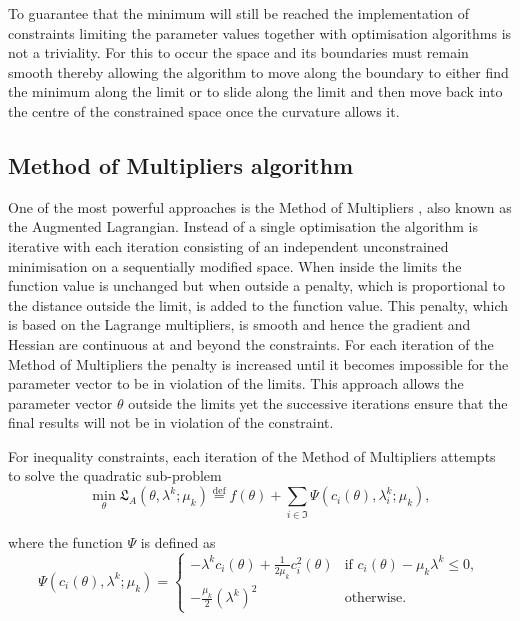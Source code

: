 To guarantee that the minimum will still be reached the implementation of constraints limiting the parameter values together with optimisation algorithms is not a triviality.
For this to occur the space and its boundaries must remain smooth thereby allowing the algorithm to move along the boundary to either find the minimum along the limit or to slide along the limit and then move back into the centre of the constrained space once the curvature allows it.



\subsection{Method of Multipliers algorithm}

One of the most powerful approaches is the Method of Multipliers \citep{NocedalWright99}, also known as the Augmented Lagrangian.
Instead of a single optimisation the algorithm is iterative with each iteration consisting of an independent unconstrained minimisation on a sequentially modified space.
When inside the limits the function value is unchanged but when outside a penalty, which is proportional to the distance outside the limit, is added to the function value.
This penalty, which is based on the Lagrange multipliers, is smooth and hence the gradient and Hessian are continuous at and beyond the constraints.
For each iteration of the Method of Multipliers the penalty is increased until it becomes impossible for the parameter vector to be in violation of the limits.
This approach allows the parameter vector $\theta$ outside the limits yet the successive iterations ensure that the final results will not be in violation of the constraint.

For inequality constraints, each iteration of the Method of Multipliers attempts to solve the quadratic sub-problem
\begin{equation} \label{eq: Augmented Lagrangian}
    \min_\theta \mathfrak{L}_A(\theta, \lambda^k; \mu_k) \stackrel{\mathrm{def}}{=} f(\theta) + \sum_{i \in \mathfrak{I}} \Psi(c_i(\theta), \lambda_i^k; \mu_k),
\end{equation}

\noindent where the function $\Psi$ is defined as
\begin{equation}
    \Psi(c_i(\theta), \lambda^k; \mu_k) = \begin{cases}
        -\lambda^k c_i(\theta) + \frac{1}{2\mu_k} c_i^2(\theta) & \textrm{if } c_i(\theta) - \mu_k \lambda^k \leqslant 0, \\
        -\frac{\mu_k}{2} (\lambda^k)^2 & \textrm{otherwise}.
    \end{cases}
\end{equation}

